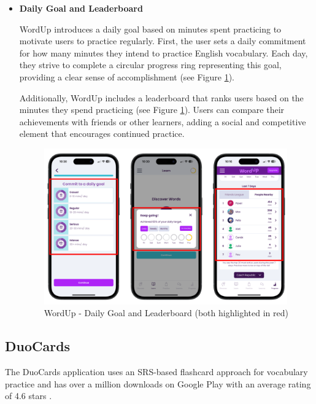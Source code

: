 \begin{itemize}
    \item \textbf{Daily Goal and Leaderboard}

    WordUp introduces a daily goal based on minutes spent practicing to motivate users to practice regularly. First, the user sets a daily commitment for how many minutes they intend to practice English vocabulary. Each day, they strive to complete a circular progress ring representing this goal, providing a clear sense of accomplishment (see Figure \ref{fig:wordup-daily-goal}).
    
    Additionally, WordUp includes a leaderboard that ranks users based on the minutes they spend practicing (see Figure \ref{fig:wordup-daily-goal}). Users can compare their achievements with friends or other learners, adding a social and competitive element that encourages continued practice. 

    \begin{figure}[!h]
        \includegraphics[width=0.99\textwidth]{src/figures/wordup-daily-goal.png}
        \caption{WordUp - Daily Goal and Leaderboard (both highlighted in red)}
        \label{fig:wordup-daily-goal}
    \end{figure}

\end{itemize}

\subsection{DuoCards}

The DuoCards application uses an SRS-based flashcard approach for vocabulary practice and has over a million downloads on Google Play with an average rating of 4.6 stars \cite{cite:duocards_google_play}. 

